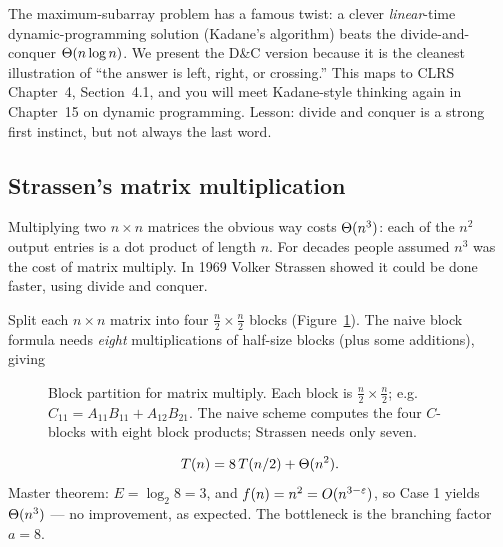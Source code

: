 \begin{connectionbox}
The maximum-subarray problem has a famous twist: a clever \emph{linear}-time
dynamic-programming solution (Kadane's algorithm) beats the divide-and-conquer
$\Theta(n\log n)$. We present the D\&C version because it is the cleanest illustration
of ``the answer is left, right, or crossing.'' This maps to CLRS Chapter~4,
Section~4.1, and you will meet Kadane-style thinking again in Chapter~15 on
dynamic programming. Lesson: divide and conquer is a strong first instinct,
but not always the last word.
\end{connectionbox}

\subsection{Strassen's matrix multiplication}

Multiplying two $n\times n$ matrices the obvious way costs $\Theta(n^3)$: each of the
$n^2$ output entries is a dot product of length $n$. For decades people assumed
$n^3$ was the cost of matrix multiply. In 1969 Volker Strassen showed it
could be done faster, using divide and conquer.

Split each $n\times n$ matrix into four $\tfrac{n}{2}\times\tfrac{n}{2}$ blocks
(Figure~\ref{ch04:strassen}). The naive block formula needs \emph{eight}
multiplications of half-size blocks (plus some additions), giving

\begin{figure}[H]
\centering
{}
\caption{Block partition for matrix multiply. Each block is
$\tfrac{n}{2}\times\tfrac{n}{2}$; e.g. $C_{11}=A_{11}B_{11}+A_{12}B_{21}$.
The naive scheme computes the four $C$-blocks with eight block products;
Strassen needs only seven.}
\label{ch04:strassen}
\end{figure}
\[T(n) = 8\,T(n/2) + \Theta(n^2).\]
Master theorem: $E=\log_2 8 = 3$, and $f(n)=n^2=O(n^{3-\varepsilon})$, so Case 1 yields
$\Theta(n^3)$ --- no improvement, as expected. The bottleneck is the branching
factor $a=8$.

